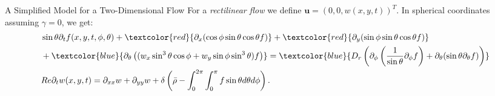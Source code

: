 \begin{frame}{A Simplified Model for a Two-Dimensional Flow}
	\scriptsize
	For a \textit{rectilinear flow} we define $\boldsymbol{u} = \left( 0, 0, w(x,y, t)\right)^T$.
In spherical coordinates assuming $\gamma = 0$, we get:
\vspace{5mm}
\begin{equation}
	\begin{aligned}
	&\sin\theta \partial_{t}f(x,y,t,\phi, \theta)+ \textcolor{red}{\partial_x(\cos\phi \sin\theta \cos\theta f)} + \textcolor{red}{\partial_y(\sin \phi \sin \theta \cos \theta f)} \\
	&+ \textcolor{blue}{\partial_\theta\left(( w_x \sin^3 \theta \cos \phi + w_y\sin \phi \sin^3 \theta) f\right)}
	= \textcolor{blue}{D_{r}\left( \partial_\phi \left(\frac{1}{\sin \theta} \partial_\phi f \right)+ \partial_\theta (\sin \theta \partial_\theta f)\right)} \\
	&Re\partial_{t}w(x,y,t) = \partial_{xx}w + \partial_{yy}w + \delta\left(\bar{\rho}-\int_{0}^{2\pi} \int_{0}^{\pi} f \sin \theta d\theta d\phi \right).
	\end{aligned}
\end{equation}
\end{frame}







